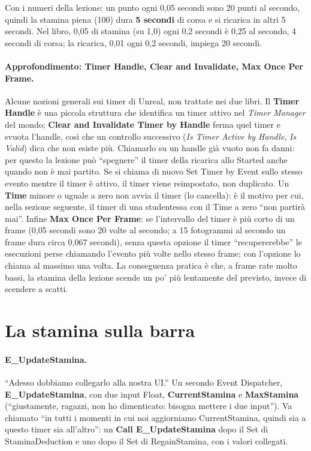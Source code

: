 Con i numeri della lezione: un punto ogni 0,05 secondi sono 20 punti al secondo, quindi
la stamina piena (100) dura \textbf{5 secondi} di corsa e si ricarica in altri 5 secondi.
Nel libro, 0,05 di stamina (su 1,0) ogni 0,2 secondi è 0,25 al secondo, 4 secondi di
corsa; la ricarica, 0,01 ogni 0,2 secondi, impiega 20 secondi.

\paragraph{Approfondimento: Timer Handle, Clear and Invalidate, Max Once Per Frame.} Alcune
nozioni generali sui timer di Unreal, non trattate nei due libri. Il \textbf{Timer Handle}
è una piccola struttura che identifica un timer attivo nel \emph{Timer Manager} del mondo;
\textbf{Clear and Invalidate Timer by Handle} ferma quel timer e svuota l'handle, così che
un controllo successivo (\emph{Is Timer Active by Handle}, \emph{Is Valid}) dica che non
esiste più. Chiamarlo su un handle già vuoto non fa danni: per questo la lezione può
``spegnere'' il timer della ricarica allo Started anche quando non è mai partito. Se si
chiama di nuovo Set Timer by Event sullo stesso evento mentre il timer è attivo, il timer
viene reimpostato, non duplicato. Un \textbf{Time} minore o uguale a zero non avvia il timer
(lo cancella): è il motivo per cui, nella sezione seguente, il timer di una studentessa con
il Time a zero ``non partirà mai''. Infine \textbf{Max Once Per Frame}: se l'intervallo
del timer è più corto di un frame (0,05 secondi sono 20 volte al secondo; a 15 fotogrammi
al secondo un frame dura circa 0,067 secondi), senza questa opzione il timer
``recupererebbe'' le esecuzioni perse chiamando l'evento più volte nello stesso frame; con
l'opzione lo chiama al massimo una volta. La conseguenza pratica è che, a frame rate molto
bassi, la stamina della lezione scende un po' più lentamente del previsto, invece di
scendere a scatti.

\section{La stamina sulla barra}
\label{ue11:sec:barrastamina}

\paragraph{E\_UpdateStamina.} ``Adesso dobbiamo collegarlo alla nostra UI.'' Un secondo
Event Dispatcher, \textbf{E\_UpdateStamina}, con due input Float, \textbf{CurrentStamina} e
\textbf{MaxStamina} (``giustamente, ragazzi, non ho dimenticato: bisogna mettere i due
input''). Va chiamato ``in tutti i momenti in cui noi aggiorniamo CurrentStamina, quindi
sia a questo timer sia all'altro'': un \textbf{Call E\_UpdateStamina} dopo il Set di
StaminaDeduction e uno dopo il Set di RegainStamina, con i valori collegati.

